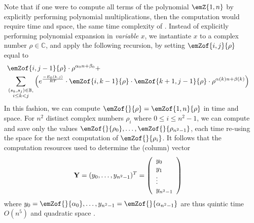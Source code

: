 Note that if one were to compute all terms of the polynomial $\emZ{1,n}$
by explicitly performing polynomial multiplications,
then the computation would require  time and  space, the
same time complexity of \cite{hofacker:RNAbor2D}.
Instead of explicitly performing polynomial expansion in {\em variable} $x$,
we instantiate $x$ to a
complex number $\rho \in \mathbb{C}$, and apply
the following recursion, by setting $\emZof{i,j}{\rho}$ equal to
\begin{align}
\label{eqn:RNAborNussRecursionInstantiated}
&\emZof{i,j-1}{\rho} \cdot \rho^{\alpha_0n+\beta_0} + \\
&\sum_{\substack{(s_k,s_j) \in \mathbb{B},\\i\le k<j}}
\left(e^{\frac{-E_0(k,j)}{RT}}\cdot
\emZof{i,k-1}{\rho} \cdot \emZof{k+1,j-1}{\rho}
\cdot \rho^{\alpha(k)n+\beta(k)} \right) \nonumber
\end{align}
In this fashion, we can compute $\emZof{}{\rho}=\emZof{1,n}{\rho}$ in
 time and  space. For $n^2$ distinct complex numbers
$\rho_i$ where $0 \leq i \leq n^2-1$, we can compute and save only the
values $\emZof{}{\rho_0},\ldots, \emZof{}{\rho_{n^2-1}}$, each time re-using the
 space for the next computation of $\emZof{}{\rho_i}$.
It follows that
the computation resources used to determine the (column) vector
\begin{align}
\label{eqn:defY}
{\bf Y} = (y_0,\ldots,y_{n^2-1})^T =
\left(
\begin{array}{l}
y_0\\
y_1\\
\vdots \\
y_{n^2-1}\\
\end{array}
\right)
\end{align}
where
$y_0=\emZof{}{\alpha_0},\ldots, y_{n^2-1}=\emZof{}{\alpha_{n^2-1}}$ are thus
quintic time $O(n^5)$ and quadratic space .

